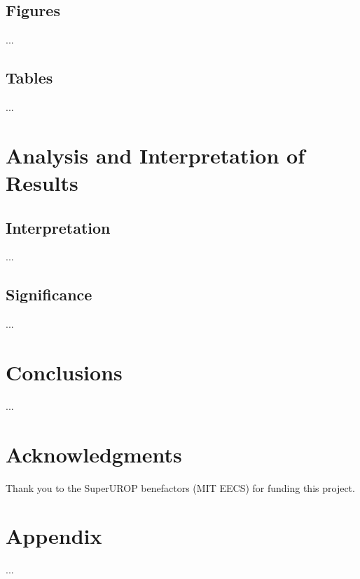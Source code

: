 \documentclass{article} %
\begin{document}
\subsection{Figures}
...


\subsection{Tables}
...


\section{Analysis and Interpretation of Results}
\subsection{Interpretation}
...

\subsection{Significance}
...

\section{Conclusions}
...

\section*{Acknowledgments}
Thank you to the SuperUROP benefactors (MIT EECS) for funding this project.




\appendix
\section{Appendix}
...
\end{document}
